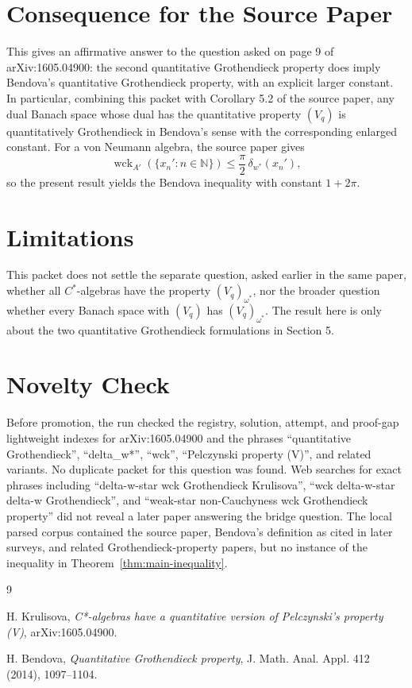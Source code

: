 \documentclass[11pt]{amsart}
\newcommand{\N}{\mathbb N}
\newcommand{\wck}{\operatorname{wck}}
\begin{document}
\section*{Consequence for the Source Paper}

This gives an affirmative answer to the question asked on page 9 of
arXiv:1605.04900: the second quantitative Grothendieck property does imply
Bendova's quantitative Grothendieck property, with an explicit larger constant.
In particular, combining this packet with Corollary 5.2 of the source paper,
any dual Banach space whose dual has the quantitative property $(V_q)$ is
quantitatively Grothendieck in Bendova's sense with the corresponding enlarged
constant. For a von Neumann algebra, the source paper gives
\[
  \wck_{A'}(\{x_n':n\in\N\})\le \frac{\pi}{2}\,\delta_{w^*}(x_n'),
\]
so the present result yields the Bendova inequality with constant
$1+2\pi$.

\section*{Limitations}

This packet does not settle the separate question, asked earlier in the same
paper, whether all $C^*$-algebras have the property $(V_q)_{\omega^*}$, nor
the broader question whether every Banach space with $(V_q)$ has
$(V_q)_{\omega^*}$. The result here is only about the two quantitative
Grothendieck formulations in Section 5.

\section*{Novelty Check}

Before promotion, the run checked the registry, solution, attempt, and
proof-gap lightweight indexes for arXiv:1605.04900 and the phrases
``quantitative Grothendieck'',
``delta\_w*'', ``wck'', ``Pelczynski property (V)'', and related variants.
No duplicate packet for this question was found. Web searches for exact
phrases including ``delta-w-star wck Grothendieck Krulisova'', ``wck
delta-w-star delta-w Grothendieck'', and ``weak-star non-Cauchyness
wck Grothendieck property'' did not reveal a later paper answering the bridge
question. The local parsed corpus contained the source paper, Bendova's
definition as cited in later surveys, and related Grothendieck-property
papers, but no instance of the inequality in Theorem~\ref{thm:main-inequality}.

\begin{thebibliography}{9}

H. Krulisova,
\emph{C*-algebras have a quantitative version of Pelczynski's property (V)},
arXiv:1605.04900.

H. Bendova,
\emph{Quantitative Grothendieck property},
J. Math. Anal. Appl. 412 (2014), 1097--1104.

\end{thebibliography}
\end{document}
